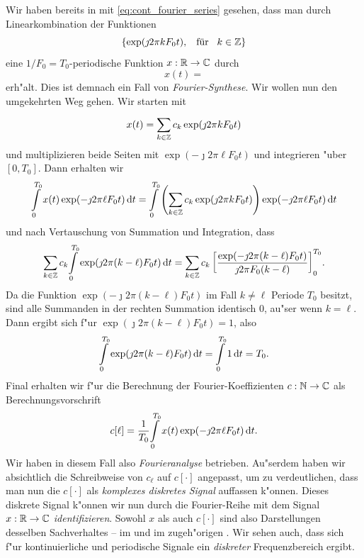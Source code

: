 Wir haben bereits in  mit \eqref{eq:cont_fourier_series} gesehen, dass man durch Linearkombination der Funktionen
\[
\{\exp(\jmath 2 \pi k F_0 t), {\hspace{3mm} \text{f\"ur} \hspace{3mm}} k \in \mathbb{Z}\}
\]
eine $1/F_0=T_0$-periodische Funktion $x: \mathbb{R} \rightarrow \mathbb{C}$ durch
\[
x(t) = 
\]
erh"alt.
Dies ist demnach ein Fall von \emph{Fourier-Synthese}.
Wir wollen nun den umgekehrten Weg gehen.
Wir starten mit 
\begin{equation}\label{eq:fourier:fourier_series}
    x(t) = {\sum\limits_{k \in \mathbb{Z}}^{}{
        c_k \exp(\jmath 2 \pi k F_0 t)
    }}
\end{equation}
und multiplizieren beide Seiten mit $\exp(-\jmath 2 \pi \ell F_0 t)$ und integrieren "uber $[0,T_0]$.
Dann erhalten wir
\[
{\int\limits_{0}^{T_0}{
    x(t) \exp(-\jmath 2 \pi \ell F_0 t)
}\,\mathrm{d}{t}} 
= {\int\limits_{0}^{T_0}{
    \left(
        {\sum\limits_{k \in \mathbb{Z}}^{}{
            c_k \exp(\jmath 2 \pi k F_0 t)
        }}
    \right)
    \exp(-\jmath 2 \pi \ell F_0 t)
}\,\mathrm{d}{t}} 
\]
und nach Vertauschung von Summation und Integration, dass
\[
{\sum\limits_{k \in \mathbb{Z}}^{}{
    c_k 
    {\int\limits_{0}^{T_0}{\exp(\jmath 2 \pi (k - \ell) F_0 t)}\,\mathrm{d}{t}}
}}
= {\sum\limits_{k \in \mathbb{Z}}^{}{
    c_k \left[
        \frac{
            \exp(-\jmath 2 \pi (k - \ell) F_0 t)
        }{
            \jmath 2 \pi F_0(k - \ell)
        }
    \right]_{0}^{T_0}
}}.
\]
Da die Funktion $\exp(-\jmath 2 \pi (k - \ell) F_0 t)$ im Fall $k \neq  \ell$ Periode $T_0$ besitzt, sind alle Summanden in der rechten Summation identisch $0$, au"ser wenn $k = \ell$.
Dann ergibt sich f"ur $\exp(\jmath 2 \pi (k - \ell) F_0 t) = 1$, also
\[
{\int\limits_{0}^{T_0}{\exp(\jmath 2 \pi (k - \ell) F_0 t)}\,\mathrm{d}{t}} 
    = {\int\limits_{0}^{T_0}{1}\,\mathrm{d}{t}} 
    = T_0.
\]
Final erhalten wir f"ur die Berechnung der Fourier-Koeffizienten $c : \mathbb{N} \rightarrow \mathbb{C}$ als Berechnungsvorschrift
\[
    c[\ell] = \frac{1}{T_0}{\int\limits_{0}^{T_0}{
        x(t) \exp(-\jmath 2 \pi \ell F_0 t)
    }\,\mathrm{d}{t}}.
\]
Wir haben in diesem Fall also \emph{Fourieranalyse} betrieben.
Au"serdem haben wir absichtlich die Schreibweise von $c_\ell$ auf $c[\cdot]$ angepasst, um zu verdeutlichen, dass man nun die $c[\cdot]$ als \emph{komplexes diskretes Signal} auffassen k"onnen.
Dieses diskrete Signal k"onnen wir nun durch die Fourier-Reihe mit dem Signal $x : \mathbb{R} \rightarrow \mathbb{C}$ \emph{identifizieren}.
Sowohl $x$ als auch $c[\cdot]$ sind also Darstellungen desselben Sachverhaltes -- im  und im zugeh"origen .
Wir sehen auch, dass sich f"ur kontinuierliche und periodische Signale ein \emph{diskreter} Frequenzbereich ergibt.

